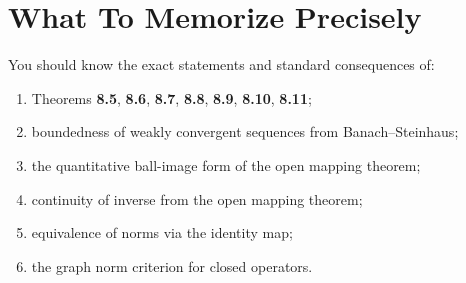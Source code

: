 \documentclass[header={Lecture 6 Exam Study Notes}]{study-note}
\begin{document}
\section{What To Memorize Precisely}

\begin{focusbox}
You should know the exact statements and standard consequences of:
\begin{enumerate}
\item Theorems \textbf{8.5}, \textbf{8.6}, \textbf{8.7}, \textbf{8.8}, \textbf{8.9}, \textbf{8.10}, \textbf{8.11};
\item boundedness of weakly convergent sequences from Banach--Steinhaus;
\item the quantitative ball-image form of the open mapping theorem;
\item continuity of inverse from the open mapping theorem;
\item equivalence of norms via the identity map;
\item the graph norm criterion for closed operators.
\end{enumerate}
\end{focusbox}
\end{document}
